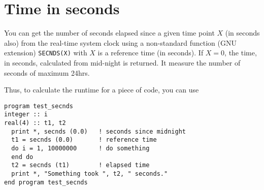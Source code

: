 \section{Time in seconds}
\label{sec:time-seconds}

You can get the number of seconds elapsed since a given time point $X$
(in seconds also) from the real-time system clock using a non-standard
function (GNU extension) \verb!SECNDS(X)!  with $X$ is a reference
time (in seconds). If $X=0$, the time, in seconds, calculated from
mid-night is returned. It measure the number of seconds of maximum
24hrs. 

Thus, to calculate the runtime for a piece of code, you can use
\begin{lstlisting}
program test_secnds
integer :: i
real(4) :: t1, t2
  print *, secnds (0.0)   ! seconds since midnight
  t1 = secnds (0.0)       ! reference time
  do i = 1, 10000000      ! do something
  end do
  t2 = secnds (t1)        ! elapsed time
  print *, "Something took ", t2, " seconds."
end program test_secnds
\end{lstlisting}

